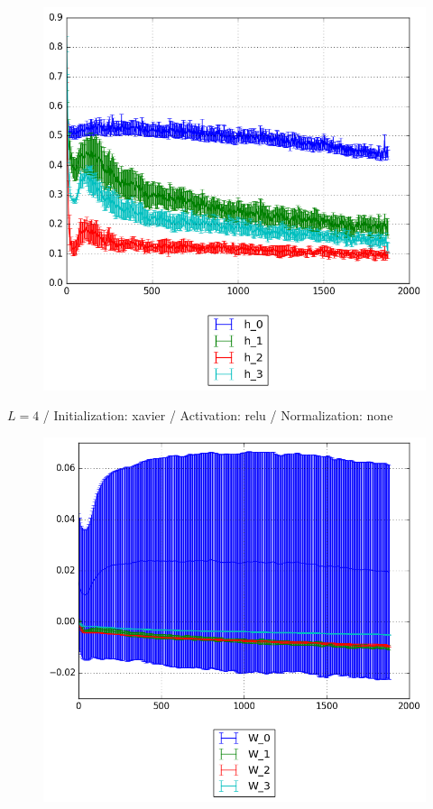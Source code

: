 \documentclass{beamer}
\begin{document}
{\begin{frame}[t]{}{}
\begin{figure}
    			\includegraphics[scale=0.4]{gfx/l4b32_relu_xavier_identity_cnn_activations}
    		\end{figure}
    		\vfill
	\end{frame}
	\begin{frame}[t]{}{}%
		\vfill
		\begin{center}
			{$L = 4$ / Initialization: xavier / Activation: relu / Normalization: none}
		\end{center}
    		\begin{figure}
    			\centering
    			\includegraphics[scale=0.4]{gfx/l4b32_relu_xavier_identity_cnn_weights}
    		\end{figure}
    		\vfill
	\end{frame}
	
}
\end{document}
